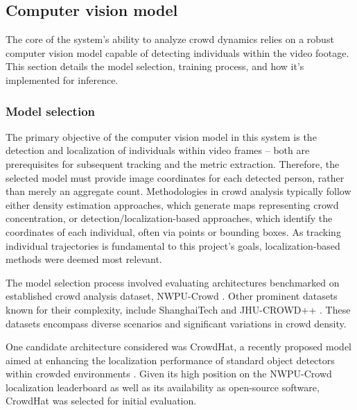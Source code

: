 % 
\subsection{Computer vision model}


The core of the system's ability to analyze crowd dynamics relies on a robust computer vision model capable of detecting individuals within the video footage. This section details the model selection, training process, and how it's implemented for inference.

\subsubsection{Model selection}

The primary objective of the computer vision model in this system is the detection and localization of individuals within video frames -- both are prerequisites for subsequent tracking and the metric extraction. Therefore, the selected model must provide image coordinates for each detected person, rather than merely an aggregate count. Methodologies in crowd analysis typically follow either density estimation approaches, which generate maps representing crowd concentration, or detection/localization-based approaches, which identify the coordinates of each individual, often via points or bounding boxes. As tracking individual trajectories is fundamental to this project's goals, localization-based methods were deemed most relevant.

The model selection process involved evaluating architectures benchmarked on established crowd analysis dataset, NWPU-Crowd \cite{nwpu}. Other prominent datasets known for their complexity, include ShanghaiTech and JHU-CROWD++ \cite{shanghai_tech} \cite{jhu_crowd}. These datasets encompass diverse scenarios and significant variations in crowd density.

One candidate architecture considered was CrowdHat, a recently proposed model aimed at enhancing the localization performance of standard object detectors within crowded environments \cite{crowdhat}. Given its high position on the NWPU-Crowd localization leaderboard as well as its availability as open-source software, CrowdHat was selected for initial evaluation.

